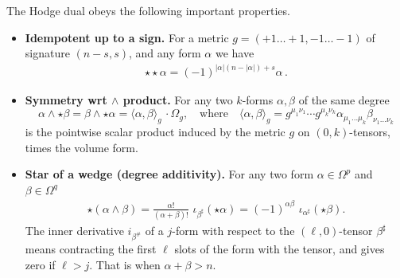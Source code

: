 \documentclass[../geometry_main.tex]{subfiles}
\begin{document}
\begin{mytheorem}
%
The Hodge dual obeys the following important properties.
\begin{itemize}
    \item \textbf{Idempotent up to a sign.} For a metric {\small \(g=(+1\dots+1,-1\dots-1)\)} of signature {\small \((n-s,s)\)}, and any form \(\alpha\) we have
    \begin{align}
        \star \star \alpha = (-1)^{|\alpha|(n-|\alpha|) + s} \alpha\,.
    \end{align}
    \item \textbf{Symmetry wrt $\wedge$ product.} For any two \(k\)-forms \(\alpha, \beta\) of the same degree
    \begin{equation}
        \alpha \wedge \star \beta = \beta \wedge \star \alpha = \langle \alpha, \beta \rangle_g \, \cdot \Omega_g,\quad \text{where}\quad \langle \alpha, \beta \rangle_g = g^{\mu_1 \nu_1} \cdots g^{\mu_k \nu_k} \alpha_{\mu_1 \dots \mu_k} \beta_{\nu_1 \dots \nu_k}
    \end{equation}
    is the pointwise scalar product induced by the metric \(g\) on $(0,k)$-tensors, times the volume form.
    \item \textbf{Star of a wedge (degree additivity).}
    For any two form $\alpha\in\Omega^p$ and $\beta\in\Omega^q$
    \begin{align}
        \star(\alpha\wedge\beta)
        =\tfrac{\alpha!}{(\alpha+\beta)!}\,\,\iota_{\beta^\sharp}(\star\alpha)
        =(-1)^{\alpha\beta}\,\,\iota_{\alpha^\sharp}(\star\beta).
    \end{align}
    The inner derivative $i_{\beta^{\#}}$ of a $j$-form with respect to the  $(\ell,0)$-tensor $\beta^\sharp$ means contracting the first $\ell$ slots of the form with the tensor, and gives zero if $\ell>j$. That is when $\alpha+\beta>n$.
\end{itemize}
\end{mytheorem}
\end{document}
